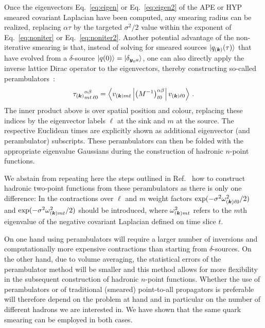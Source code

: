 Once the eigenvectors Eq.~\eqref{eq:eigen} or
Eq.~\eqref{eq:eigen2} of the APE or HYP
smeared covariant Laplacian have been computed,
any smearing radius can be realized, replacing
$\alpha\tau$ by the targeted $\sigma^2/2$ value within the exponent of
Eq.~\eqref{eq:noniter} or Eq.~\eqref{eq:noniter2}.
Another potential advantage of the non-iterative smearing is
that, instead of solving for smeared sources
$|q_{(\boldsymbol{k})}(\tau)\rangle$ that have evolved from
a $\delta$-source $|q(0)\rangle=|\delta_{\boldsymbol{y}_0a}\rangle$,
one can also directly apply the inverse lattice Dirac operator to
the eigenvectors, thereby
constructing so-called perambulators~\cite{Peardon:2009gh}:
\begin{equation}
{\tau_{(\ensuremath{\boldsymbol{k}})}}^{\alpha\beta}_{m t\, \ell 0}=\left\langle v_{(\boldsymbol{k})m t}\left|\left(M^{-1}\right)^{\alpha\beta}_{t0}\right|v_{(\boldsymbol{k})\ell 0}\right\rangle\,.
\end{equation}
The inner product above is over spatial position and colour,
replacing these indices by the eigenvector labels
$\ell$ at the sink and $m$ at the source. The respective
Euclidean times are
explicitly shown as additional eigenvector (and perambulator) subscripts.
These perambulators can then be folded with the appropriate
eigenvalue Gaussians during the construction
of hadronic $n$-point functions.

We abstain from repeating here the steps outlined in
Ref.~\cite{Peardon:2009gh} how to construct hadronic two-point
functions from these perambulators as there is only one
difference: In the contractions over $\ell$ and $m$ weight factors
$\exp(-\sigma^2\omega_{(\boldsymbol{k})\ell 0}^2/2)$
and $\exp(-\sigma^2\omega_{(\boldsymbol{k})m t}^2/2)$ should be introduced,
where $\omega_{(\boldsymbol{k})m t}^2$ refers to the $m$th eigenvalue
of the negative covariant Laplacian defined on time slice $t$.

On one hand using perambulators will require a larger number of inversions
and computationally more expensive contractions
than starting from $\delta$-sources.
On the other hand, due to volume averaging, the statistical
errors of the perambulator method will be smaller and this method allows
for more flexibility in the subsequent construction of hadronic
$n$-point functions.
Whether the use of perambulators
or of traditional (smeared) point-to-all propagators is preferable
will therefore depend on the problem at hand and in particular on
the number of different hadrons we are interested in. We have
shown that the same quark smearing can be employed in both cases.

